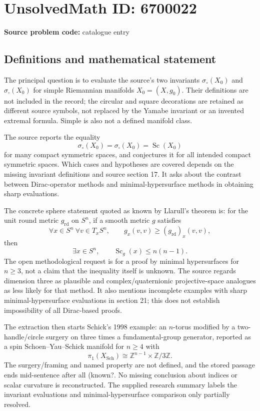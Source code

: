 \documentclass[11pt]{article}
\newcommand{\Z}{\mathbb{Z}}
\begin{document}
\section*{UnsolvedMath ID: 6700022}
\textbf{Source problem code:} catalogue entry
\subsection{Definitions and mathematical statement}
The principal question is to evaluate the source's two invariants \(\sigma_\circ(X_0)\) and \(\sigma_\square(X_0)\) for simple Riemannian manifolds \(X_0=(X,g_0)\). Their definitions are not included in the record; the circular and square decorations are retained as different source symbols, not replaced by the Yamabe invariant or an invented extremal formula. Simple is also not a defined manifold class.

The source reports the equality
\[
\sigma_\circ(X_0)=\sigma_\square(X_0)=\operatorname{Sc}(X_0)
\]
for many compact symmetric spaces, and conjectures it for all intended compact symmetric spaces. Which cases and hypotheses are covered depends on the missing invariant definitions and source section 17. It asks about the contrast between Dirac-operator methods and minimal-hypersurface methods in obtaining sharp evaluations.

The concrete sphere statement quoted as known by Llarull's theorem is: for the unit round metric \(g_{\mathrm{rd}}\) on \(S^n\), if a smooth metric \(g\) satisfies
\[
\forall x\in S^n\ \forall v\in T_xS^n,\qquad
g_x(v,v)\ge(g_{\mathrm{rd}})_x(v,v),
\]
then
\[
\exists x\in S^n,\qquad \operatorname{Sc}_g(x)\le n(n-1).
\]
The open methodological request is for a proof by minimal hypersurfaces for \(n\ge3\), not a claim that the inequality itself is unknown. The source regards dimension three as plausible and complex/quaternionic projective-space analogues as less likely for that method. It also mentions incomplete examples with sharp minimal-hypersurface evaluations in section 21; this does not establish impossibility of all Dirac-based proofs.

The extraction then starts Schick's 1998 example: an \(n\)-torus modified by a two-handle/circle surgery on three times a fundamental-group generator, reported as a spin Schoen--Yau--Schick manifold for \(n\ge4\) with
\[
\pi_1(X_{\mathrm{Sch}})\cong\Z^{n-1}\times\Z/3\Z.
\]
The surgery/framing and named property are not defined, and the stored passage ends mid-sentence after all (known?. No missing conclusion about indices or scalar curvature is reconstructed. The supplied research summary labels the invariant evaluations and minimal-hypersurface comparison only partially resolved.
\end{document}
